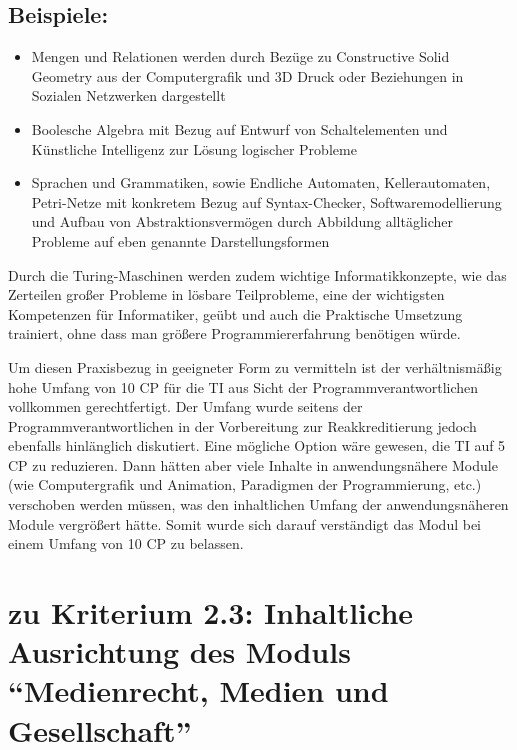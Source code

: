 \subsection{Beispiele:}\label{beispiele}

\begin{itemize}
\tightlist
\item
  Mengen und Relationen werden durch Bezüge zu Constructive Solid
  Geometry aus der Computergrafik und 3D Druck oder Beziehungen in
  Sozialen Netzwerken dargestellt
\item
  Boolesche Algebra mit Bezug auf Entwurf von Schaltelementen und
  Künstliche Intelligenz zur Lösung logischer Probleme
\item
  Sprachen und Grammatiken, sowie Endliche Automaten, Kellerautomaten,
  Petri-Netze mit konkretem Bezug auf Syntax-Checker,
  Softwaremodellierung und Aufbau von Abstraktionsvermögen durch
  Abbildung alltäglicher Probleme auf eben genannte Darstellungsformen
\end{itemize}

Durch die Turing-Maschinen werden zudem wichtige Informatikkonzepte, wie
das Zerteilen großer Probleme in lösbare Teilprobleme, eine der
wichtigsten Kompetenzen für Informatiker, geübt und auch die Praktische
Umsetzung trainiert, ohne dass man größere Programmiererfahrung
benötigen würde.

Um diesen Praxisbezug in geeigneter Form zu vermitteln ist der
verhältnismäßig hohe Umfang von 10 CP für die TI aus Sicht der
Programmverantwortlichen vollkommen gerechtfertigt. Der Umfang wurde
seitens der Programmverantwortlichen in der Vorbereitung zur
Reakkreditierung jedoch ebenfalls hinlänglich diskutiert. Eine mögliche
Option wäre gewesen, die TI auf 5 CP zu reduzieren. Dann hätten aber
viele Inhalte in anwendungsnähere Module (wie Computergrafik und
Animation, Paradigmen der Programmierung, etc.) verschoben werden
müssen, was den inhaltlichen Umfang der anwendungsnäheren Module
vergrößert hätte. Somit wurde sich darauf verständigt das Modul bei
einem Umfang von 10 CP zu belassen.

\section{\texorpdfstring{zu Kriterium 2.3: Inhaltliche Ausrichtung
des Moduls ``Medienrecht, Medien und
Gesellschaft''}{zu Kriterium 2.3: Inhaltliche Ausrichtung des Moduls Medienrecht, Medien und Gesellschaft}}\label{zu-kriterium-2.3-inhaltliche-ausrichtung-des-moduls-medienrecht-medien-und-gesellschaft}

